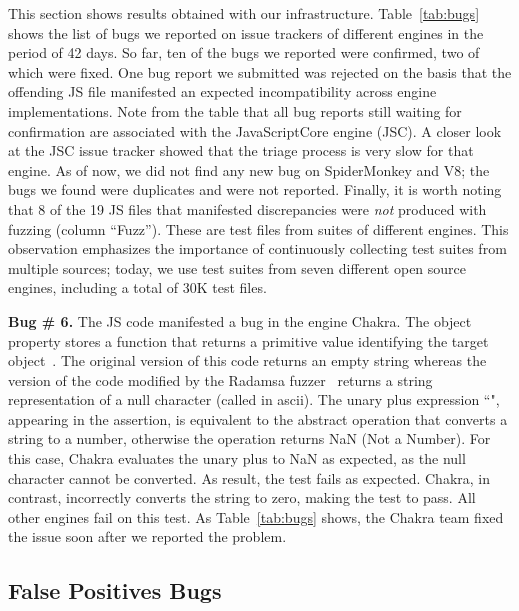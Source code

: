 \documentclass[10pt,conference,anonymous]{IEEEtran}
\begin{document}
This section shows results obtained with our
infrastructure. Table~\ref{tab:bugs} shows the list of bugs we
reported on issue trackers of different engines in the period of 42
days. So far, ten of the bugs we reported
were confirmed, two of which were fixed. One bug report we
submitted was rejected on the basis that the offending JS file
manifested an expected incompatibility across engine
implementations.
Note from the table that all bug
reports still waiting for confirmation are associated with the
JavaScriptCore engine (JSC). A closer look at the JSC issue tracker
showed that the triage process is very slow for that engine. As of
now, we did not find any new bug on SpiderMonkey and V8; the bugs we
found were duplicates and were not reported. Finally, it is
worth noting that 8 of the 19 JS files that manifested
discrepancies were \emph{not} produced with fuzzing (column
``Fuzz''). These are test files from suites of different engines. This
observation emphasizes the importance of continuously collecting test suites from
multiple sources; today, we use test suites from seven different open
source engines, including a total of 30K test files.

 

\vspace{1ex}\noindent\textbf{Bug \# 6.} The JS code  
manifested a bug in the \js{} engine Chakra.  The object
property  stores a function that returns a primitive
value identifying the target object~\cite{valueof}. The original
version of this code returns an empty string whereas the version of
the code modified by the Radamsa fuzzer~\cite{radamsa} returns a string
representation of a null character (called  in ascii). The
unary plus expression ``", appearing in the assertion, is
equivalent to the abstract operation 
that converts a string to a number, otherwise the operation returns
NaN (Not a Number)\cite{unary-plus}. For this case, Chakra evaluates
the unary plus to NaN as expected, as the null character cannot be
converted. As result, the test fails as expected. Chakra, in contrast,
incorrectly converts the string to zero, making the test to pass. All
other engines fail on this test. As Table~\ref{tab:bugs} shows, the
Chakra team fixed the issue soon after we reported the problem.

\subsection{False Positives Bugs}
\end{document}
